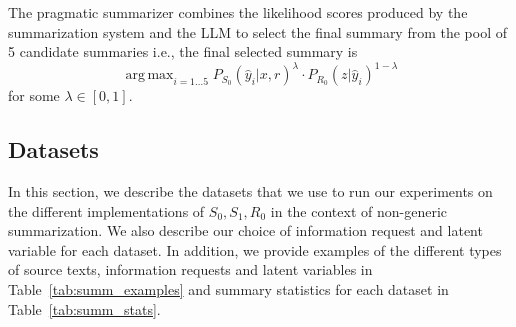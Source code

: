 \documentclass[11pt]{article}
\DeclareMathOperator*{\argmax}{arg\,max}
\begin{document}
The pragmatic summarizer combines the likelihood scores produced by the summarization system and the LLM to select the final summary from the pool of 5 candidate summaries i.e., the final selected summary is
\begin{equation}    
    \argmax_{i=1 \dots 5} P_{S_0}(\hat{y}_i|x,r)^\lambda \cdot P_{R_0}(z|\hat{y}_i)^{1 - \lambda}
\end{equation}
for some $\lambda \in [0, 1]$.

\subsection{Datasets}

\label{sec:datasets}

In this section, we describe the datasets that we use to run our experiments on the different implementations of $S_0, S_1, R_0$ in the context of non-generic summarization. We also describe our choice of information request and latent variable for each dataset. In addition, we provide examples of the different types of source texts, information requests and latent variables in Table~\ref{tab:summ_examples} and summary statistics for each dataset in Table~\ref{tab:summ_stats}.
\end{document}
